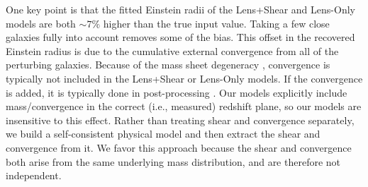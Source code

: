 One key point is that the fitted Einstein radii of the Lens+Shear and Lens-Only models are both $\sim 7\%$ higher than the true input value. Taking a few close galaxies fully into account removes some of the bias. This offset in the recovered Einstein radius is due to the cumulative external convergence from all of the perturbing galaxies. Because of the mass sheet degeneracy \citep{Falco85}, convergence is typically not included in the Lens+Shear or Lens-Only models. If the convergence is added, it is typically done in post-processing \citep{Collett13, Suyu10}. Our models explicitly include mass/convergence in the correct (i.e., measured) redshift plane, so our models are insensitive to this effect. Rather than treating shear and convergence separately, we build a self-consistent physical model and then extract the shear and convergence from it. We favor this approach because the shear and convergence both arise from the same underlying mass distribution, and are therefore not independent.
  